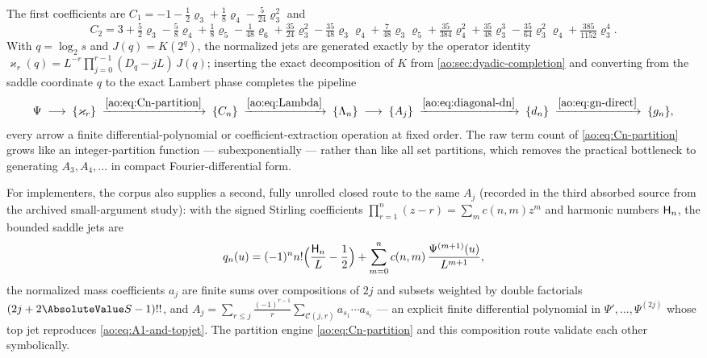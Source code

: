 The first coefficients are
$C_1=-1-\tfrac12\varrho_3+\tfrac18\varrho_4
-\tfrac5{24}\varrho_3^{2}$ and
\begin{equation}
 C_2=3+\tfrac52\varrho_3-\tfrac58\varrho_4+\tfrac18\varrho_5
 -\tfrac1{48}\varrho_6
 +\tfrac{35}{24}\varrho_3^{2}-\tfrac{35}{48}\varrho_3\varrho_4
 +\tfrac7{48}\varrho_3\varrho_5+\tfrac{35}{384}\varrho_4^{2}
 +\tfrac{35}{48}\varrho_3^{3}
 -\tfrac{35}{64}\varrho_3^{2}\varrho_4
 +\tfrac{385}{1152}\varrho_3^{4}.
 \label{ao:eq:C2}
\end{equation}
With $q=\log_2s$ and $J(q)=K(2^{q})$, the normalized jets are
generated exactly by the operator identity
$\varkappa_r(q)=L^{-r}\prod_{j=0}^{r-1}(D_q-jL)\,J(q)$; inserting
the exact decomposition of $K$ from
\cref{ao:sec:dyadic-completion} and converting from the saddle
coordinate $q$ to the exact Lambert phase completes the pipeline
\begin{equation}
 \Psi
 \;\longrightarrow\;\{\varkappa_r\}
 \;\xrightarrow{\eqref{ao:eq:Cn-partition}}\;\{C_n\}
 \;\xrightarrow{\eqref{ao:eq:Lambda}}\;\{\Lambda_n\}
 \;\longrightarrow\;\{A_j\}
 \;\xrightarrow{\eqref{ao:eq:diagonal-dn}}\;\{d_n\}
 \;\xrightarrow{\eqref{ao:eq:gn-direct}}\;\{g_n\},
 \label{ao:eq:pipeline}
\end{equation}
every arrow a finite differential-polynomial or
coefficient-extraction operation at fixed order.  The raw term count
of \eqref{ao:eq:Cn-partition} grows like an integer-partition function
--- subexponentially --- rather than like all set partitions, which
removes the practical bottleneck to generating $A_3,A_4,\dots$ in
compact Fourier-differential form.

For implementers, the corpus also supplies a second, fully unrolled
closed route to the same $A_j$ (recorded in the third absorbed
source from the archived small-argument study): with the signed
Stirling coefficients $\prod_{r=1}^{n}(z-r)=\sum_mc(n,m)z^{m}$ and
harmonic numbers $\mathsf H_n$, the bounded saddle jets are
\begin{equation}
 q_n(u)=(-1)^{n}n!\Bigl(\frac{\mathsf H_n}{L}-\frac12\Bigr)
 +\sum_{m=0}^{n}c(n,m)\,\frac{\Psi^{(m+1)}(u)}{L^{m+1}},
 \label{ao:eq:qn-jets}
\end{equation}
the normalized mass coefficients $a_j$ are finite sums over
compositions of $2j$ and subsets weighted by double factorials
$(2j+2\AbsoluteValue S-1)!!$, and
$A_j=\sum_{r\le j}\frac{(-1)^{r-1}}r
\sum_{\mathcal C(j,r)}a_{s_1}\cdots a_{s_r}$ --- an explicit finite
differential polynomial in $\Psi',\dots,\Psi^{(2j)}$ whose top jet
reproduces \eqref{ao:eq:A1-and-topjet}.  The partition engine
\eqref{ao:eq:Cn-partition} and this composition route validate each
other symbolically.


